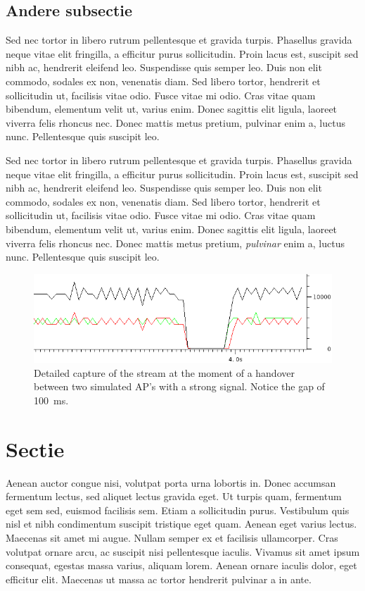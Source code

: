 \documentclass[twocolumn]{phdsymp} %
\begin{document}
\subsection{Andere subsectie}
Sed nec tortor in libero rutrum pellentesque et gravida turpis. Phasellus gravida neque vitae elit fringilla, a efficitur purus sollicitudin. Proin lacus est, suscipit sed nibh ac, hendrerit eleifend leo. Suspendisse quis semper leo. Duis non elit commodo, sodales ex non, venenatis diam. Sed libero tortor, hendrerit et sollicitudin ut, facilisis vitae odio. Fusce vitae mi odio. Cras vitae quam bibendum, elementum velit ut, varius enim. Donec sagittis elit ligula, laoreet viverra felis rhoncus nec. Donec mattis metus pretium, pulvinar enim a, luctus nunc. Pellentesque quis suscipit leo.

Sed nec tortor in libero rutrum pellentesque et gravida turpis. Phasellus gravida neque vitae elit fringilla, a efficitur purus sollicitudin. Proin lacus est, suscipit sed nibh ac, hendrerit eleifend leo. Suspendisse quis semper leo. Duis non elit commodo, sodales ex non, venenatis diam. Sed libero tortor, hendrerit et sollicitudin ut, facilisis vitae odio. Fusce vitae mi odio. Cras vitae quam bibendum, elementum velit ut, varius enim. Donec sagittis elit ligula, laoreet viverra felis rhoncus nec. Donec mattis metus pretium, \textit{pulvinar} enim a, luctus nunc. Pellentesque quis suscipit leo.

\begin{figure}[ht]
	\begin{center}
		\includegraphics[width=.40\textwidth]{referentie-detail}
		\caption{\label{2AP}Detailed capture of the stream at the moment of a handover between two simulated AP's with a strong signal.  Notice the gap of 100~ms.}
	\end{center}
\end{figure}

\section{Sectie}
Aenean auctor congue nisi, volutpat porta urna lobortis in. Donec accumsan fermentum lectus, sed aliquet lectus gravida eget. Ut turpis quam, fermentum eget sem sed, euismod facilisis sem. Etiam a sollicitudin purus. Vestibulum quis nisl et nibh condimentum suscipit tristique eget quam. Aenean eget varius lectus. Maecenas sit amet mi augue. Nullam semper ex et facilisis ullamcorper. Cras volutpat ornare arcu, ac suscipit nisi pellentesque iaculis. Vivamus sit amet ipsum consequat, egestas massa varius, aliquam lorem. Aenean ornare iaculis dolor, eget efficitur elit. Maecenas ut massa ac tortor hendrerit pulvinar a in ante.
\end{document}
